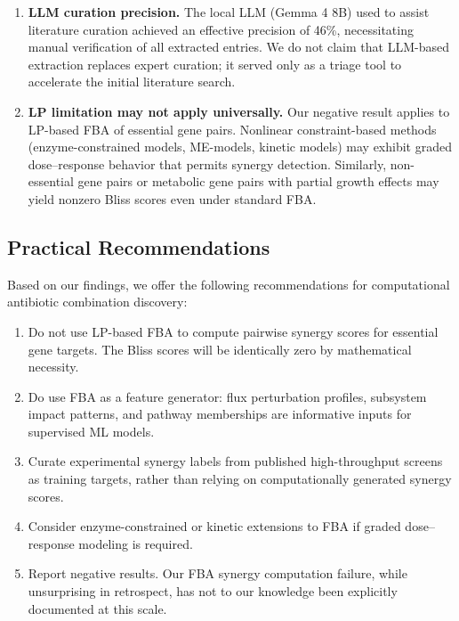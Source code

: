 \documentclass[12pt,a4paper]{article}
\begin{document}
\begin{enumerate}
    \item \textbf{LLM curation precision.} The local LLM (Gemma 4 8B) used to assist literature curation achieved an effective precision of 46\%, necessitating manual verification of all extracted entries. We do not claim that LLM-based extraction replaces expert curation; it served only as a triage tool to accelerate the initial literature search.

    \item \textbf{LP limitation may not apply universally.} Our negative result applies to LP-based FBA of essential gene pairs. Nonlinear constraint-based methods (enzyme-constrained models, ME-models, kinetic models) may exhibit graded dose--response behavior that permits synergy detection. Similarly, non-essential gene pairs or metabolic gene pairs with partial growth effects may yield nonzero Bliss scores even under standard FBA.
\end{enumerate}

\subsection{Practical Recommendations}

Based on our findings, we offer the following recommendations for computational antibiotic combination discovery:

\begin{enumerate}
    \item Do not use LP-based FBA to compute pairwise synergy scores for essential gene targets. The Bliss scores will be identically zero by mathematical necessity.
    \item Do use FBA as a feature generator: flux perturbation profiles, subsystem impact patterns, and pathway memberships are informative inputs for supervised ML models.
    \item Curate experimental synergy labels from published high-throughput screens \citep{brochado2018, cokol2011} as training targets, rather than relying on computationally generated synergy scores.
    \item Consider enzyme-constrained or kinetic extensions to FBA \citep{sanchez2017} if graded dose--response modeling is required.
    \item Report negative results. Our FBA synergy computation failure, while unsurprising in retrospect, has not to our knowledge been explicitly documented at this scale.
\end{enumerate}
\end{document}
